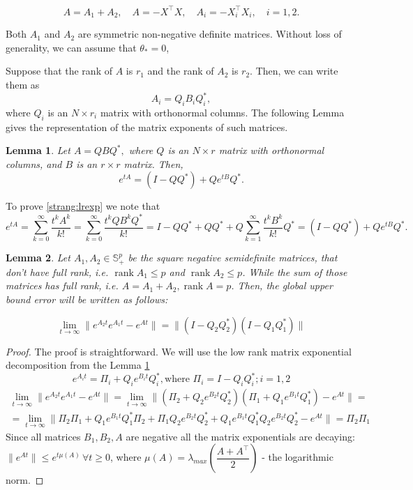 \documentclass{article} %
\newtheorem{lemma}{Lemma}
\begin{document}
$$A = A_1 + A_2, \quad A = -X^{\top} X, \quad A_i = -X^{\top}_i X_i, \quad i = 1, 2.$$

Both $A_1$ and $A_2$ are symmetric non-negative definite matrices. Without loss of generality, we can assume that $\theta_* = 0$,

Suppose that the rank of $A$ is $r_1$ and the rank of $A_2$ is $r_2$. Then, we can write them as
$$A_i = Q_i B_i Q^*_i,$$
where $Q_i$ is an $N \times r_i$ matrix with orthonormal columns.  The following Lemma gives the representation of the matrix exponents of such matrices.
\begin{lemma}\label{strang:lemexp}
Let $A = Q B Q^*,$ where $Q$ is an $N \times r$ matrix with orthonormal columns, and $B$ is an $r \times r$ matrix. Then,
\begin{equation}\label{strang:lrexp}
    e^{t A}  = (I - QQ^*) + Q e^{t B} Q^*.
\end{equation}
\end{lemma}
To prove \eqref{strang:lrexp} we note that
$$e^{t A} = \sum_{k=0}^{\infty} \frac{t^k A^k}{k!} = \sum_{k=0}^{\infty} \frac{t^k Q B^k Q^*}{k!} =
I - QQ^* + QQ^* + Q \sum_{k=1}^{\infty} \frac{t^k B^k}{k!} Q^* = (I - QQ^*) + Q e^{t B} Q^*.
$$

\begin{lemma}
	\label{strang:lemupper_2}
	Let $A_1, A_2 \in \mathbb{S}^p_{+}$ be the square negative semidefinite matrices, that don't have full rank, i.e. $\operatorname{rank}{A_1} \leq p$ and $\operatorname{rank}{A_2} \leq p$. While the sum of those matrices has full rank, i.e. $A = A_1 + A_2, \operatorname{rank}{A} = p$. Then, the global upper bound error will be written as follows:

	\begin{equation}\label{strang:lemupper}
		\lim_{t \to \infty}\| e^{A_2t}e^{A_1t} - e^{At}\| = \|(I - Q_2Q_2^*)(I - Q_1Q_1^*)\|
	\end{equation}
\end{lemma}
\begin{proof}
	The proof is straightforward. We will use the low rank matrix exponential decomposition from the Lemma \ref{strang:lemexp}
	$$
	e^{A_it} = \Pi_i + Q_i e^{B_it} Q_i^*, \text{where } \Pi_i = I - Q_iQ_i^*; i = 1,2
	$$
	\begin{align*}
	\lim_{t \to \infty}\| e^{A_2t}e^{A_1t} - e^{At}\| = \lim_{t \to \infty}\| (\Pi_2 + Q_2 e^{B_2t} Q_2^*)(\Pi_1 + Q_1 e^{B_1t} Q_1^*) - e^{At}\| = \\
	= \lim_{t \to \infty}\| \Pi_2\Pi_1 + Q_1 e^{B_1t} Q_1^*\Pi_2 + \Pi_1Q_2 e^{B_2t} Q_2^* +  Q_1 e^{B_1t} Q_1^* Q_2 e^{B_2t} Q_2^* - e^{At}\| = \Pi_2 \Pi_1
	\end{align*}
	Since all matrices $B_1, B_2, A$ are negative all the matrix exponentials are decaying: $\|e^{At}\|\leq e^{t\mu (A)}\, \forall t\geq 0$, where $\mu(A) = \lambda_{max} \left( \dfrac{A + A^\top}{2}\right)$ - the logarithmic norm.
\end{proof}
\end{document}
